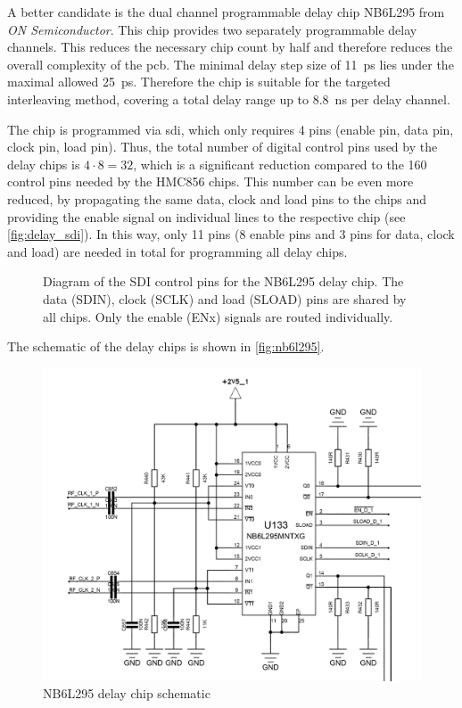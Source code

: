 A better candidate is the dual channel programmable delay chip NB6L295 from \textit{ON Semiconductor}. 
This chip provides two separately programmable delay channels. 
This reduces the necessary chip count by half and therefore reduces the overall complexity of the \gls{pcb}.
The minimal delay step size of \SI{11}{\pico\second} lies under the maximal allowed \SI{25}{\pico \second}. Therefore the chip is suitable for the targeted interleaving method, covering a total delay range up to \SI{8.8}{\nano\second} per delay channel.

The chip is programmed via \gls{sdi}, which only requires 4 pins (enable pin, data pin, clock pin, load pin). %
Thus, the total number of digital control pins used by the delay chips is $4\cdot8 = 32$, which is a significant reduction compared to the 160 control pins needed by the HMC856 chips. 
This number can be even more reduced, by propagating the same data, clock and load pins to the chips and providing the enable signal on individual lines to the respective chip (see \autoref{fig:delay_sdi}). 
In this way, only 11 pins (8 enable pins and 3 pins for data, clock and load) are needed in total for programming all delay chips. 

\begin{figure}[tbh]
	\centering
	\resizebox{1\textwidth}{!}{}
	\caption[Delay chip SDI connections]{Diagram of the SDI control pins for the NB6L295 delay chip. The data (SDIN), clock (SCLK) and load (SLOAD) pins are shared by all chips. Only the enable (ENx) signals are routed individually.}
	\label{fig:delay_sdi}
\end{figure}

The schematic of the delay chips is shown in \autoref{fig:nb6l295}.
\begin{figure}[tbh]
	\centering
	\includegraphics[width = \textwidth]{chap/04-work/img/delay_chip}
	\caption{NB6L295 delay chip schematic}
	\label{fig:nb6l295}
\end{figure}





